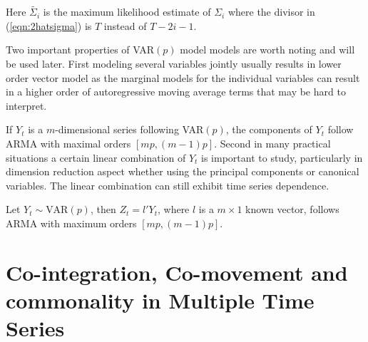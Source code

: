 Here $\tilde{\Sigma_i}$ is the maximum likelihood estimate of $\Sigma_i$ where the divisor in (\ref{eqn:2hatsigma}) is $T$ instead of $T - 2i - 1$.

Two important properties of VAR$(p)$ model models are worth noting and will be used later. First modeling several variables jointly usually results in lower order vector model as the marginal models for the individual variables can result in a higher order of autoregressive moving average terms that may be hard to interpret. \\


\begin{result}\label{res:5} If $Y_t$ is a $m$-dimensional series following VAR$(p)$, the components of $Y_t$ follow ARMA with maximal orders $[mp,(m-1)p]$. Second in many practical situations a certain linear combination of $Y_t$ is important to study, particularly in dimension reduction aspect whether using the principal components or canonical variables. The linear combination can still exhibit time series dependence. 
\end{result}


\begin{result}\label{res:6} Let $Y_t \sim \text{VAR}(p)$, then $Z_t=l'Y_t$, where $l$ is a $m \times 1$ known vector, follows ARMA with maximum orders $[mp,(m-1)p]$. 
\end{result}


\section{Co-integration, Co-movement and commonality in Multiple Time Series\label{sec:comts}}


